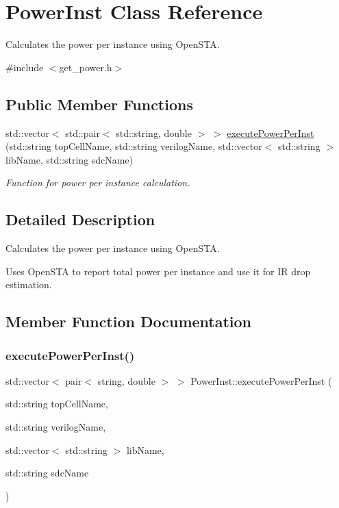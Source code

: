 \hypertarget{classPowerInst}{}\section{Power\+Inst Class Reference}
\label{classPowerInst}


Calculates the power per instance using Open\+S\+TA.  




{\ttfamily \#include $<$get\+\_\+power.\+h$>$}

\subsection*{Public Member Functions}
\begin{DoxyCompactItemize}
\item 
std\+::vector$<$ std\+::pair$<$ std\+::string, double $>$ $>$ \hyperlink{classPowerInst_aa07965840fe0c88b8ee80a8d4a1ff0e8}{execute\+Power\+Per\+Inst} (std\+::string top\+Cell\+Name, std\+::string verilog\+Name, std\+::vector$<$ std\+::string $>$ lib\+Name, std\+::string sdc\+Name)
\begin{DoxyCompactList}\small\item\em Function for power per instance calculation. \end{DoxyCompactList}\end{DoxyCompactItemize}


\subsection{Detailed Description}
Calculates the power per instance using Open\+S\+TA. 

Uses Open\+S\+TA to report total power per instance and use it for IR drop estimation. 

\subsection{Member Function Documentation}
\mbox{\label{classPowerInst_aa07965840fe0c88b8ee80a8d4a1ff0e8}} 
\subsubsection{\texorpdfstring{execute\+Power\+Per\+Inst()}{executePowerPerInst()}}
{\footnotesize\ttfamily std\+::vector$<$ pair$<$ string, double $>$ $>$ Power\+Inst\+::execute\+Power\+Per\+Inst (\begin{DoxyParamCaption}\item[{std\+::string}]{top\+Cell\+Name,  }\item[{std\+::string}]{verilog\+Name,  }\item[{std\+::vector$<$ std\+::string $>$}]{lib\+Name,  }\item[{std\+::string}]{sdc\+Name }\end{DoxyParamCaption})}



